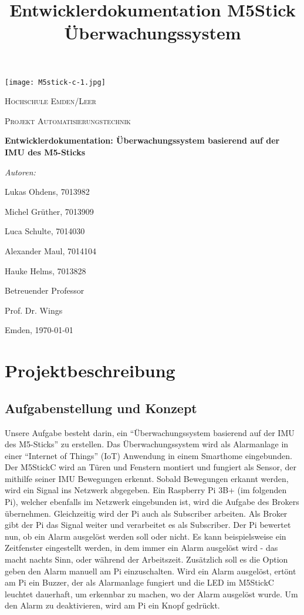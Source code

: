 \documentclass[a4paper,12pt]{article}
\title{Entwicklerdokumentation M5Stick Überwachungssystem}
\begin{document}
\begin{titlepage}
	\centering
	\texttt{[image: M5stick-c-1.jpg]}\par\vspace{1cm}
	{\scshape\LARGE Hochschule Emden/Leer \par}
	\vspace{1cm}
	{\scshape\Large Projekt Automatisierungstechnik\par}
	\vspace{1.5cm}
	{\huge\bfseries Entwicklerdokumentation: Überwachungssystem basierend
	auf der IMU des
	M5-Sticks\par}
	\vspace{2cm}
	{\Large\itshape Autoren:\par {Lukas Ohdens, 7013982\par
	Michel Grüther, 7013909\par Luca Schulte, 7014030\par Alexander
	Maul, 7014104\par Hauke Helms, 7013828}\par}
	\vfill
	Betreuender Professor\par
	Prof. Dr. Wings

	\vfill

	{\large Emden, \today\par}
\end{titlepage}

\tableofcontents
\newpage

\section{Projektbeschreibung}
\subsection{Aufgabenstellung und Konzept}
Unsere Aufgabe besteht darin, ein “Überwachungssystem basierend auf der IMU des M5-Sticks” zu erstellen. Das Überwachungssystem wird als Alarmanlage in einer “Internet of Things” (IoT) Anwendung in einem Smarthome eingebunden. Der M5StickC wird an Türen und Fenstern montiert und fungiert als Sensor, der mithilfe seiner IMU Bewegungen erkennt. Sobald Bewegungen erkannt werden, wird ein Signal ins Netzwerk abgegeben. Ein Raspberry Pi 3B+ (im folgenden Pi), welcher ebenfalls im Netzwerk eingebunden ist, wird die Aufgabe des Brokers übernehmen. Gleichzeitig wird der Pi auch als Subscriber arbeiten. Als Broker gibt der Pi das Signal weiter und verarbeitet es als Subscriber. Der Pi bewertet nun, ob ein Alarm ausgelöst werden soll oder nicht. Es kann beispielsweise ein Zeitfenster eingestellt werden, in dem immer ein Alarm ausgelöst wird - das macht nachts Sinn, oder während der Arbeitszeit. Zusätzlich soll es die Option geben den Alarm manuell am Pi einzuschalten. Wird ein Alarm ausgelöst, ertönt am Pi ein Buzzer, der als Alarmanlage fungiert und die LED im M5StickC leuchtet dauerhaft, um erkennbar zu machen, wo der Alarm ausgelöst wurde. Um den Alarm zu deaktivieren, wird am Pi ein Knopf gedrückt.
\end{document}
